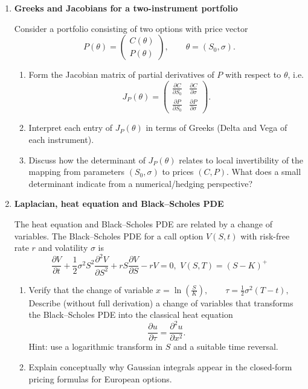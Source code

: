 \documentclass[11pt]{article}
\begin{document}
\begin{enumerate}
\bigskip
\item \textbf{Greeks and Jacobians for a two-instrument portfolio}

Consider a portfolio consisting of two options with price vector
\[
 P(\theta)=\begin{pmatrix}C(\theta)\\[4pt] P(\theta)\end{pmatrix},\qquad
 \theta=(S_0,\sigma).
\]

\begin{enumerate}
\item Form the Jacobian matrix of partial derivatives of \(P\) with respect to \(\theta\), i.e.
\[
J_P(\theta)=
\begin{pmatrix}
\displaystyle \frac{\partial C}{\partial S_0} & \displaystyle \frac{\partial C}{\partial \sigma} \\[8pt]
\displaystyle \frac{\partial P}{\partial S_0} & \displaystyle \frac{\partial P}{\partial \sigma}
\end{pmatrix}.
\]
\item Interpret each entry of \(J_P(\theta)\) in terms of Greeks (Delta and Vega of each instrument).
\item Discuss how the determinant of \(J_P(\theta)\) relates to local invertibility of the mapping from parameters \((S_0,\sigma)\) to prices \((C,P)\). What does a small determinant indicate from a numerical/hedging perspective?
\end{enumerate}

\bigskip
\item \textbf{Laplacian, heat equation and Black--Scholes PDE}

The heat equation and Black--Scholes PDE are related by a change of variables.
The Black--Scholes PDE for a call option \(V(S,t)\) with risk-free rate \(r\) and volatility \(\sigma\) is
\[
\frac{\partial V}{\partial t}
+ \frac{1}{2}\sigma^2 S^2 \frac{\partial^2 V}{\partial S^2}
+ r S \frac{\partial V}{\partial S}
- r V = 0, \,\, V(S, T) = (S-K)^+
\]

\begin{enumerate}
\item Verify that the change of variable $
x = \ln\!\left(\frac{S}{K}\right), 
\qquad 
\tau = \frac{1}{2}\sigma^2 (T - t),
$
Describe (without full derivation) a change of variables that transforms the Black--Scholes PDE into the classical heat equation
\[
\frac{\partial u}{\partial \tau} = \frac{\partial^2 u}{\partial x^2}.
\]
Hint: use a logarithmic transform in \(S\) and a suitable time reversal.
\item Explain conceptually why Gaussian integrals appear in the closed-form pricing formulas for European options.
\end{enumerate}


\end{enumerate}
\end{document}
